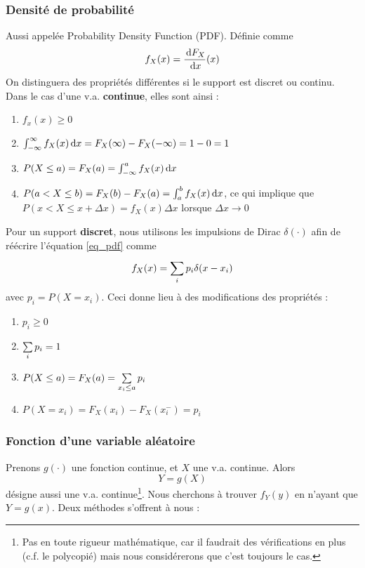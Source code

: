 \documentclass[11pt,a4paper]{article}
\numberwithin{equation}{section}
\begin{document}
\subsubsection{Densité de probabilité}
Aussi appelée Probability Density Function (PDF). Définie comme 
\begin{equation}
	f_X(x) = \frac{\, \mathrm d F_X}{\, \mathrm d x}(x)
	\label{eq_pdf}
\end{equation}
On distinguera des propriétés différentes si le support est discret ou continu. Dans le cas d'une v.a. \textbf{continue}, elles sont ainsi :
\begin{enumerate}[label=P\arabic*.]
	\item $f_x(x) \geq 0$
	\item $\int_{-\infty}^{\infty} f_X(x) \, \mathrm d x = F_X(\infty) - F_X(-\infty) = 1-0 = 1$
	\item $P(X\leq a) = F_X(a) = \int_{-\infty}^a f_X(x) \, \mathrm d x$
	\item $P(a < X \leq b) = F_X(b) - F_X(a) = \int_a^b f_X(x) \, \mathrm d x$, ce qui implique que $P(x < X \leq x+\Delta x) = f_X(x)\Delta x$ lorsque $\Delta x \to 0$
\end{enumerate}
Pour un support \textbf{discret}, nous utilisons les impulsions de Dirac $\delta(\cdot)$ afin de réécrire l'équation \ref{eq_pdf} comme 
\[f_X(x) = \sum\limits_{i}^{}p_i\delta(x-x_i)\]
avec $p_i = P(X=x_i)$. Ceci donne lieu à des modifications des propriétés :
\begin{enumerate}[label=P\arabic*.]
	\item $p_i \geq 0$
	\item $\sum\limits_{i}^{} p_i = 1$
	\item $P(X \leq a) = F_X(a) = \sum\limits_{x_i\leq a}^{} p_i$
	\item $P(X = x_i) = F_X(x_i) - F_X(x_i^-) = p_i$
\end{enumerate}
\subsubsection{Fonction d'une variable aléatoire}
Prenons $g(\cdot)$ une fonction continue, et $X$ une v.a. continue. Alors 
\[Y = g(X)\] 
désigne aussi une v.a. continue\footnote{Pas en toute rigueur mathématique, car il faudrait des vérifications en plus (c.f. le polycopié) mais nous considérerons que c'est toujours le cas.}. Nous cherchons à trouver $f_Y(y)$  en n'ayant que $Y = g(x)$. Deux méthodes s'offrent à nous :
\end{document}
